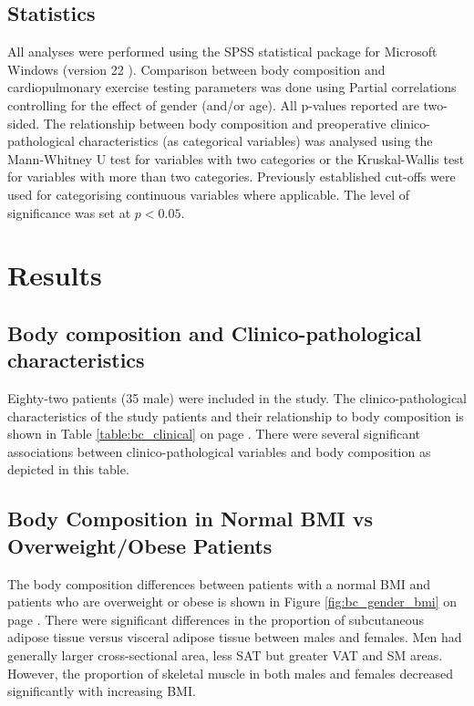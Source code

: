 \subsection{Statistics}

All analyses were performed using the SPSS statistical package for Microsoft Windows (version 22 ). Comparison between body composition and cardiopulmonary exercise testing parameters was done using Partial correlations controlling for the effect of gender (and/or age). All p-values reported are two-sided. The relationship between body composition and preoperative clinico-pathological characteristics (as categorical variables) was analysed using the Mann-Whitney U test for variables with two categories or the Kruskal-Wallis test for variables with more than two categories. Previously established cut-offs were used for categorising continuous variables where applicable. The level of significance was set at $p<0.05$.

\clearpage
\section{Results}

\subsection{Body composition and Clinico-pathological characteristics}
Eighty-two patients (35 male) were included in the study. The clinico-pathological characteristics of the study patients and their relationship to body composition is shown in Table \ref{table:bc_clinical} on page \pageref{table:bc_clinical}. There were several significant associations between clinico-pathological variables and body composition as depicted in this table.

	

\subsection{Body Composition in Normal BMI vs Overweight/Obese Patients}
The body composition differences between patients with a normal BMI and patients who are overweight or obese is shown in Figure \ref{fig:bc_gender_bmi} on page \pageref{fig:bc_gender_bmi}. There were significant differences in the proportion of subcutaneous adipose tissue versus visceral adipose tissue between males and females. Men had generally larger cross-sectional area, less SAT but greater VAT and SM areas. However, the proportion of skeletal muscle in both males and females decreased significantly with increasing BMI.

